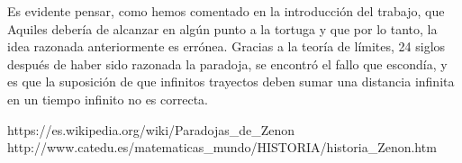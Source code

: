 \documentclass[a4paper,12pt]{article}
\begin{document}
   Es evidente pensar, como hemos comentado en la introducción del trabajo, que Aquiles
   debería de alcanzar en algún punto a la tortuga y que por lo tanto, la idea razonada
   anteriormente es errónea. Gracias a la teoría de límites, 24 siglos después de haber sido
   razonada la paradoja, se encontró el fallo que escondía, y es que la suposición de que infinitos 
   trayectos deben sumar una distancia infinita en un tiempo infinito no es correcta.
      
   \newpage
   
   \begin{thebibliography}{99}
   
       https://es.wikipedia.org/wiki/Paradojas\_de\_Zenon
       http://www.catedu.es/matematicas\_mundo/HISTORIA/historia\_Zenon.htm
      
      
   \end{thebibliography}
  
\end{document}
